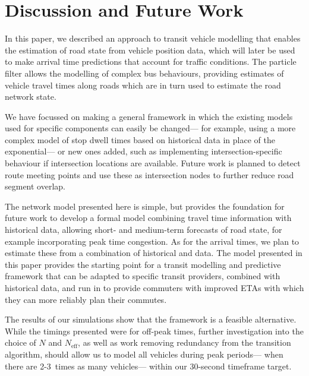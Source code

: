 \section{Discussion and Future Work}
\label{sec:discussion}

In this paper, we described an approach to transit vehicle modelling
that enables the \rt estimation of road state from vehicle position data,
which will later be used to make arrival time predictions
that account for \rt traffic conditions.
The particle filter allows the modelling of complex bus behaviours,
providing estimates of vehicle travel times along roads
which are in turn used to estimate the road network state.


We have focussed on making a general framework
in which the existing models used for specific components
can easily be changed---%
for example, using a more complex model of stop dwell times
based on historical data in place of the exponential---%
or new ones added, such as implementing intersection-specific behaviour
if intersection locations are available.
Future work is planned to detect route meeting points
and use these as intersection nodes
 to further reduce road segment overlap.


The network model presented here is simple, 
but provides the foundation for future work to
develop a formal model combining \rt travel time information with historical data, 
allowing short- and medium-term forecasts of road state,
for example incorporating peak time congestion.
As for the arrival times, 
we plan to estimate these from a combination of historical 
and \rt data.
The model presented in this paper provides the starting point
for a transit modelling and predictive framework
that can be adapted to specific transit providers,
combined with historical data,
and run in \rt to provide commuters with
improved ETAs with which they can more reliably
plan their commutes.


The results of our simulations show that the framework is a 
feasible \rt alternative.
While the timings presented were for off-peak times,
further investigation into the choice of $N$ and $N_\text{eff}$,
as well as work removing redundancy from the transition algorithm,
should allow us to model all vehicles during peak periods---%
when there are 2-3~times as many vehicles---%
within our 30-second timeframe target.
